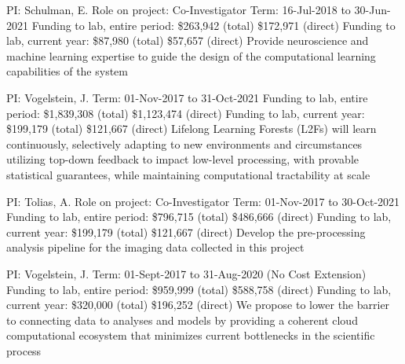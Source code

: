 \documentclass[10pt,colorlinks=true,urlcolor=blue]{moderncv}
\begin{document}
{\newline PI: Schulman, E.
\newline Role on project: Co-Investigator
\newline Term: 16-Jul-2018 to 30-Jun-2021
\newline Funding to lab, entire period: \$263,942 (total) \$172,971 (direct)
\newline Funding to lab, current year: \$87,980 (total) \$57,657 (direct)
\newline Provide neuroscience and machine learning expertise to guide the design of the
computational learning capabilities of the system}{}{}{}

{\newline PI: Vogelstein, J.
\newline Term: 01-Nov-2017 to 31-Oct-2021
\newline Funding to lab, entire period: \$1,839,308 (total) \$1,123,474 (direct)
\newline Funding to lab, current year: \$199,179 (total) \$121,667 (direct)
\newline Lifelong Learning Forests (L2Fs) will learn continuously, selectively adapting to new
environments and circumstances utilizing top-down feedback to impact low-level
processing, with provable statistical guarantees, while maintaining computational tractability
at scale}{}{}{}{}

{\newline PI: Tolias, A.
\newline Role on project: Co-Investigator
\newline Term: 01-Nov-2017 to 30-Oct-2021
\newline Funding to lab, entire period: \$796,715 (total) \$486,666 (direct)
\newline Funding to lab, current year: \$199,179 (total) \$121,667 (direct)
\newline Develop the pre-processing analysis pipeline for the imaging data collected in this project}{}{}{}

{\newline PI: Vogelstein, J.
\newline Term: 01-Sept-2017 to 31-Aug-2020 (No Cost Extension)
\newline Funding to lab, entire period: \$959,999 (total) \$588,758 (direct)
\newline Funding to lab, current year: \$320,000 (total) \$196,252 (direct)
\newline We propose to lower the barrier to connecting data to analyses and models by providing a
coherent cloud computational ecosystem that minimizes current bottlenecks in the scientific
process}{}{}{}
\end{document}

